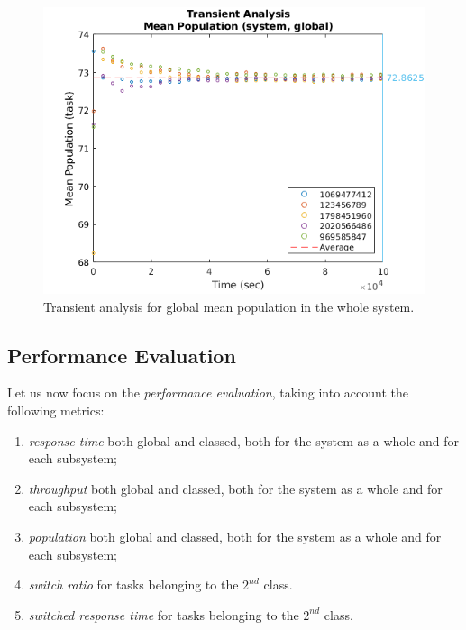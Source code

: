 \begin{figure}
	\includegraphics[width=\columnwidth]{fig/evaluation-transient-analysis-mean-population}
	\caption{Transient analysis for global mean population in the whole system.}
	\label{fig:evaluation-transient-analysis-mean-population}
\end{figure}


\subsection{Performance Evaluation}
Let us now focus on the \textit{performance evaluation}, taking into account the following metrics:

\begin{enumerate}
	\item \textit{response time} both global and classed, both for the system as a whole and for each subsystem;
	
	\item \textit{throughput} both global and classed, both for the system as a whole and for each subsystem;
	
	\item \textit{population} both global and classed, both for the system as a whole and for each subsystem;
	
	\item \textit{switch ratio} for tasks belonging to the $2^{nd}$ class.
	
	\item \textit{switched response time} for tasks belonging to the $2^{nd}$ class.
\end{enumerate}

